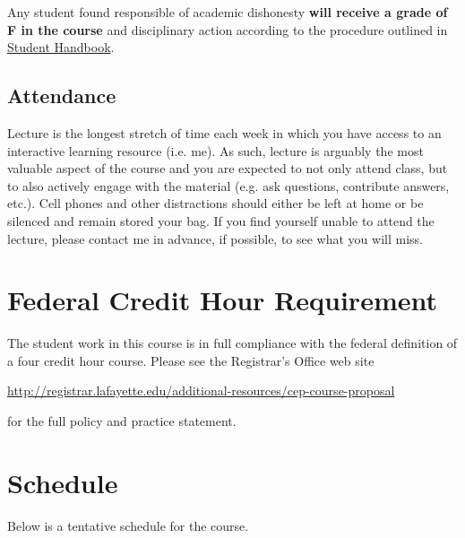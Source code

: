 \documentclass[12pt]{amsart}
\begin{document}
Any student found responsible of academic dishonesty \textbf{will receive a grade of F in the course} and disciplinary action according to the procedure outlined in \href{https://conduct.lafayette.edu/wp-content/uploads/sites/93/2018/08/StudentHandboook-2018-19.pdf}{Student Handbook}.

\subsection*{Attendance}
Lecture is the longest stretch of time each week in which you have access to an interactive learning resource (i.e. me).
As such, lecture is arguably the most valuable aspect of the course and you are expected to not only attend class, but to also actively engage with the material (e.g. ask questions, contribute answers, etc.).
Cell phones and other distractions should either be left at home or be silenced and remain stored your bag.
If you find yourself unable to attend the lecture, please contact me in advance, if possible, to see what you will miss.

\section*{Federal Credit Hour Requirement}
The student work in this course is in full compliance with the federal definition of a four credit hour course.
Please see the Registrar's Office web site

\begin{center}
  \url{http://registrar.lafayette.edu/additional-resources/cep-course-proposal}
\end{center}
for the full policy and practice statement.

\section*{Schedule}
Below is a tentative schedule for the course.

\end{document}
